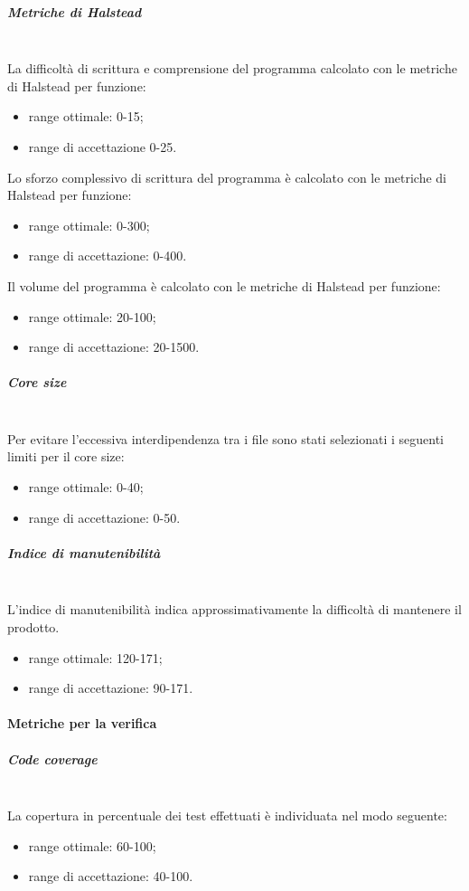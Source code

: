 \subparagraph{Metriche di Halstead}\mbox{}\\
La difficoltà di scrittura e comprensione del programma calcolato con le metriche di Halstead per funzione:
\begin{itemize}
	\item range ottimale: 0-15;
	\item range di accettazione 0-25.
\end{itemize}

Lo sforzo complessivo di scrittura del programma è calcolato con le metriche di Halstead per funzione:
\begin{itemize}
	\item range ottimale: 0-300;
	\item range di accettazione: 0-400.
\end{itemize}

Il volume del programma è calcolato con le metriche di Halstead per funzione:
\begin{itemize}
	\item range ottimale: 20-100;
	\item range di accettazione: 20-1500.
\end{itemize}

\subparagraph{Core size}\mbox{}\\
Per evitare l'eccessiva interdipendenza tra i file sono stati selezionati i seguenti limiti per il core size:
\begin{itemize}
	\item range ottimale: 0-40;
	\item range di accettazione: 0-50.
\end{itemize}

\subparagraph{Indice di manutenibilità}\mbox{}\\
L'indice di manutenibilità indica approssimativamente la difficoltà di mantenere il prodotto.
\begin{itemize}
	\item range ottimale: 120-171;
	\item range di accettazione: 90-171.
\end{itemize}

\paragraph{Metriche per la verifica}\mbox{}
\subparagraph{Code coverage}\mbox{}\\
La copertura in percentuale dei test effettuati è individuata nel modo seguente:
\begin{itemize}
	\item range ottimale: 60-100;
	\item range di accettazione: 40-100.
\end{itemize}


